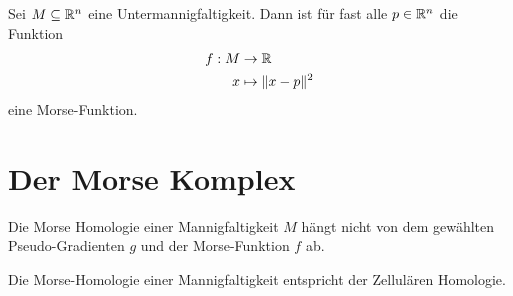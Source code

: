 \documentclass[a4paper,11pt,draft]{scrreport}
\begin{document}
\begin{lemma}

\end{lemma}

\begin{theorem}

\end{theorem}

\begin{theorem}
    Sei $M \subseteq { \mathbb R }^n$ eine Untermannigfaltigkeit. Dann ist für fast alle
    $p \in { \mathbb R }^n$ die Funktion
    \begin{align*}
        f: M &\to { \mathbb R } \\
        x &\mapsto \lVert x - p \rVert^2
    \end{align*}
    eine Morse-Funktion.
\end{theorem}

\section{Der Morse Komplex}

\begin{definition}

\end{definition}

\begin{definition}

\end{definition}

\begin{definition}

\end{definition}

\begin{lemma}
    Die Morse Homologie einer Mannigfaltigkeit $M$ hängt nicht von dem gewählten
    Pseudo-Gradienten $g$ und der Morse-Funktion $f$ ab.
\end{lemma}

\begin{theorem}
    Die Morse-Homologie einer Mannigfaltigkeit entspricht der Zellulären 
    Homologie.
\end{theorem}
\end{document}
